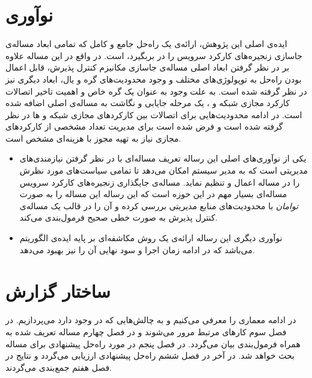 \section{نوآوری}
ایده‌ی اصلی این پژوهش، ارائه‌ی یک راه‌حل جامع و کامل که تمامی ابعاد مساله‌ی جاسازی
زنجیره‌های کارکرد سرویس را در بربگیرد، است.
در واقع در این مساله علاوه بر در نظر گرفتن ابعاد اصلی مساله‌ی جاسازی مکانیزم کنترل پذیرش،
قابل اعمال بودن راه‌حل به توپولوژی‌های مختلف و وجود محدودیت‌های گره و یال، ابعاد دیگری نیز در نظر گرفته شده است.
به علت وجود 
به عنوان یک گره خاص و اهمیت تاخیر اتصالات کارکرد مجازی شبکه و ،
یک مرحله جایابی و نگاشت به مساله‌ی اصلی اضافه شده است.
در ادامه محدودیت‌هایی برای اتصالات بین کارکردهای مجازی شبکه و ها
در نظر گرفته شده است و فرض شده است برای مدیریت تعداد مشخصی از کارکردهای مجازی نیاز به تهیه
مجوز با هزینه‌ای مشخص است.

\begin{itemize}
    \item
    یکی از نوآوری‌های اصلی این رساله تعریف مساله‌ای با در نظر گرفتن نیازمندی‌های مدیریتی است
    که به مدیر سیستم امکان می‌دهد تا تمامی سیاست‌های مورد نظرش را در مساله اعمال و تنظیم نماید.
    مساله‌ی جایگذاری زنجیره‌های کارکرد سرویس مساله‌ای بسیار مهم در این حوزه است
    که این رساله این مساله را به صورت \emph{توامان} با محدودیت‌های منابع مدیریتی بررسی کرده و
    آن را در قالب یک مساله‌ی کنترل پذیرش به صورت خطی صحیح فرمول‌بندی می‌کند.
    \item
    نوآوری دیگری این رساله ارائه‌ی یک روش مکاشفه‌ای بر پایه ایده‌ی الگوریتم \cite{Bari2015}
    می‌باشد که در ادامه زمان اجرا و سود نهایی آن را نیز بهبود می‌دهد.
\end{itemize}

\section{ساختار گزارش}
در ادامه معماری 
را معرفی می‌کنیم
و به چالش‌هایی که در  وجود دارد می‌پردازیم.
در فصل سوم کارهای مرتبط مرور می‌شوند و در فصل چهارم مساله تعریف شده به همراه فرمول‌بندی بیان می‌گردد. در فصل پنجم
در مورد راه‌حل پیشنهادی برای مساله بحث خواهد شد.
در آخر در فصل ششم راه‌حل پیشنهادی ارزیابی می‌گردد
و نتایج در فصل هفتم جمع‌بندی می‌گردند.
